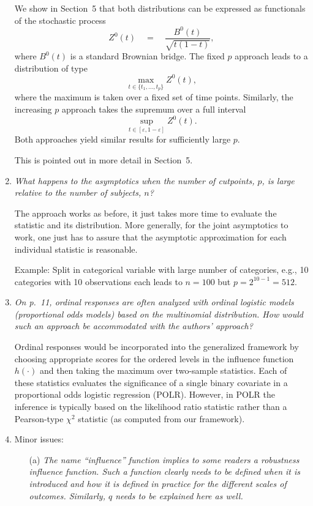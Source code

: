\documentclass[11pt,a4paper]{article}
\begin{document}
\begin{enumerate}
	We show in Section~5 that both distributions can be expressed as functionals
	of the stochastic process	
	  \[ Z^0(t) \quad = \quad \frac{B^0(t)}{\sqrt{t (1 - t)}}, \]
	where $B^0(t)$ is a standard Brownian bridge. The fixed $p$ approach leads to
	a distribution of type
	  \[ \max_{t \in \{t_1, \dots, t_p\}} Z^0(t), \]
	where the maximum is taken over a fixed set of time points. Similarly, the increasing $p$
	approach takes the supremum over a full interval
	  \[ \sup_{t \in [\varepsilon, 1 - \varepsilon]} Z^0(t). \]
        Both approaches yield similar results for sufficiently large $p$.

	This is pointed out in more detail in Section~5.
		
  \item \textit{What happens to the asymptotics when the number of cutpoints, $p$,
        is large relative to the number of subjects, $n$?}
	
	The approach works as before, it just takes more time to evaluate the statistic
	and its distribution. More generally, for the joint asymptotics to work, one
	just has to assure that the asymptotic approximation for each individual statistic
	is reasonable.

	Example: Split in categorical variable with large number of categories, e.g.,
	10 categories with 10 observations each leads to $n = 100$ but
	$p = 2^{10 - 1} = 512$.
	
  \item \textit{On p.~11, ordinal responses are often analyzed with ordinal
        logistic models (proportional odds models) based on the multinomial
	distribution. How would such an approach be accommodated with the
	authors' approach?}
	
	Ordinal responses would be incorporated into the generalized framework
	by choosing appropriate scores for the ordered levels in the influence
	function $h(\cdot)$ and then taking the maximum over two-sample statistics.
	Each of these statistics evaluates the significance of a single binary
	covariate in a proportional odds logistic regression (POLR). However, in
	POLR the inference is typically based on the likelihood ratio statistic
	rather than a Pearson-type $\chi^2$ statistic (as computed from our
	framework).
	
  \item Minor issues:
  
  \begin{itemize}
  
    \item[(a)] \textit{The name ``influence'' function implies to some readers a
               robustness influence function. Such a function clearly needs to be
	       defined when it is introduced and how it is defined in practice
	       for the different scales of outcomes. Similarly, $q$ needs to be
	       explained here as well.}
	       

\end{itemize}
\end{enumerate}
\end{document}
